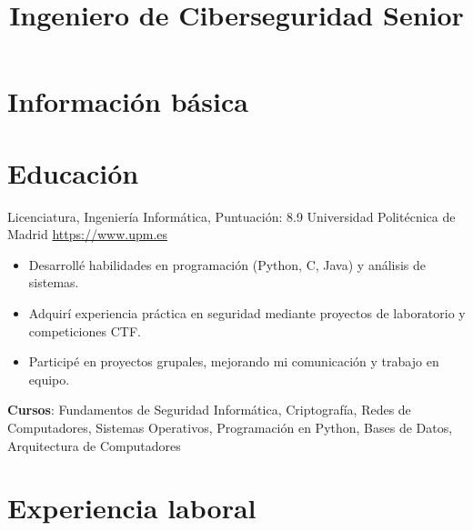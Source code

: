 \documentclass[a4paper, serif, 10pt]{moderncv}
\title{Ingeniero de Ciberseguridad Senior}
\begin{document}
\maketitle

\section{Información básica}

\section{Educación}

        {Licenciatura, Ingeniería Informática, Puntuación: 8.9}
        {Universidad Politécnica de Madrid}
        {\url{https://www.upm.es}}
        {}
        {\begin{itemize}
\item Desarrollé habilidades en programación (Python, C, Java) y análisis de sistemas.
\item Adquirí experiencia práctica en seguridad mediante proyectos de laboratorio y competiciones CTF.
\item Participé en proyectos grupales, mejorando mi comunicación y trabajo en equipo.
\end{itemize}
\textbf{Cursos}: Fundamentos de Seguridad Informática, Criptografía, Redes de Computadores, Sistemas Operativos, Programación en Python, Bases de Datos, Arquitectura de Computadores}
\section{Experiencia laboral}
\end{document}
